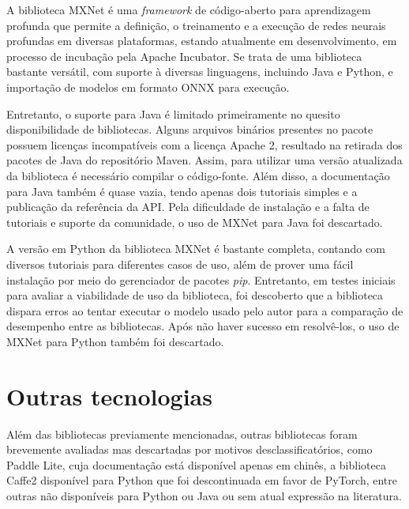 A biblioteca MXNet \cite{ml_site_mxnet} é uma \textit{framework} de código-aberto para aprendizagem profunda que permite a definição, o treinamento e a execução de redes neurais profundas em diversas plataformas, estando atualmente em desenvolvimento, em processo de incubação pela Apache Incubator. Se trata de uma biblioteca bastante versátil, com suporte à diversas linguagens, incluindo Java e Python, e importação de modelos em formato ONNX para execução.

Entretanto, o suporte para Java é limitado primeiramente no quesito disponibilidade de bibliotecas. Alguns arquivos binários presentes no pacote possuem licenças incompatíveis com a licença Apache 2, resultado na retirada dos pacotes de Java do repositório Maven. Assim, para utilizar uma versão atualizada da biblioteca é necessário compilar o código-fonte. Além disso, a documentação para Java também é quase vazia, tendo apenas dois tutoriais simples e a publicação da referência da API. Pela dificuldade de instalação e a falta de tutoriais e suporte da comunidade, o uso de MXNet para Java foi descartado.

A versão em Python da biblioteca MXNet é bastante completa, contando com diversos tutoriais para diferentes casos de uso, além de prover uma fácil instalação por meio do gerenciador de pacotes \textit{pip}. Entretanto, em testes iniciais para avaliar a viabilidade de uso da biblioteca, foi descoberto que a biblioteca dispara erros ao tentar executar o modelo usado pelo autor para a comparação de desempenho entre as bibliotecas. Após não haver sucesso em resolvê-los, o uso de MXNet para Python também foi descartado.

\section{Outras tecnologias}

Além das bibliotecas previamente mencionadas, outras bibliotecas foram brevemente avaliadas mas descartadas por motivos desclassificatórios, como Paddle Lite, cuja documentação está disponível apenas em chinês, a biblioteca Caffe2 disponível para Python que foi descontinuada em favor de PyTorch, entre outras não disponíveis para Python ou Java ou sem atual expressão na literatura.